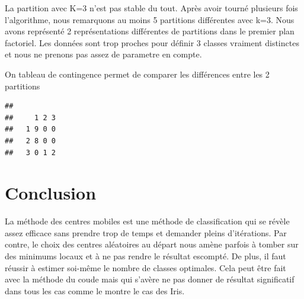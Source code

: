 \documentclass{article}\usepackage[]{graphicx}\usepackage[]{color}
\makeatletter
\newenvironment{kframe}{%
 \def\at@end@of@kframe{}%
 \ifinner\ifhmode%
  \def\at@end@of@kframe{\end{minipage}}%
  \begin{minipage}{\columnwidth}%
 \fi\fi%
 \def\FrameCommand##1{\hskip\@totalleftmargin \hskip-\fboxsep
 \colorbox{shadecolor}{##1}\hskip-\fboxsep
     \hskip-\linewidth \hskip-\@totalleftmargin \hskip\columnwidth}%
 \MakeFramed {\advance\hsize-\width
   \@totalleftmargin\z@ \linewidth\hsize
   \@setminipage}}%
 {\par\unskip\endMakeFramed%
 \at@end@of@kframe}
\newenvironment{knitrout}{}{} %
\makeatother
\begin{document}
La partition avec K=3 n'est pas stable du tout. Après avoir tourné plusieurs fois l'algorithme, nous remarquons au moins 5 partitions différentes avec k=3. Nous avons représenté 2 représentations différentes de partitions dans le premier plan factoriel. Les données sont trop proches pour définir 3 classes vraiment distinctes et nous ne prenons pas assez de parametre en compte. 

On tableau de contingence permet de comparer les différences entre les 2 partitions

\begin{knitrout}
\color{fgcolor}\begin{kframe}
\begin{verbatim}
##    
##     1 2 3
##   1 9 0 0
##   2 8 0 0
##   3 0 1 2
\end{verbatim}
\end{kframe}
\end{knitrout}
\section*{Conclusion}

La méthode des centres mobiles est une méthode de classification qui se révèle assez efficace sans prendre trop de temps et demander pleins d'itérations. Par contre, le choix des centres aléatoires au départ nous amène parfois à tomber sur des minimums locaux et à ne pas rendre le résultat escompté. De plus, il faut réussir à estimer soi-même le nombre de classes optimales. Cela peut être fait avec la méthode du coude mais qui s'avère ne pas donner de résultat significatif dans tous les cas comme le montre le cas des Iris. 
\end{document}
